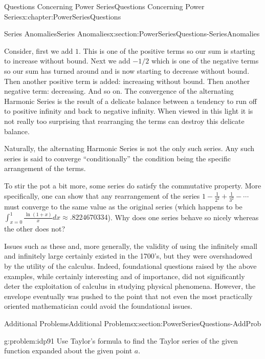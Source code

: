 \begin{chapterptx}{Questions Concerning Power Series}{}{Questions Concerning Power Series}{}{}{x:chapter:PowerSeriesQuestions}
\begin{sectionptx}{Series Anomalies}{}{Series Anomalies}{}{}{x:section:PowerSeriesQuestions-SeriesAnomalies}
		\par
		Consider, first we add \(1\). This is one of the positive terms so our sum is starting to increase without bound. Next we add \(-1/2\) which is one of the negative terms so our sum has turned around and is now starting to decrease without bound. Then another positive term is added: increasing without bound. Then another negative term: decreasing. And so on. The convergence of the alternating Harmonic Series is the result of a delicate balance between a tendency to run off to positive infinity and back to negative infinity. When viewed in this light it is not really too surprising that rearranging the terms can destroy this delicate balance.%
		\par
		Naturally, the alternating Harmonic Series is not the only such series. Any such series is said to converge ``conditionally'' \textemdash{} the condition being the specific arrangement of the terms.%
		\par
		To stir the pot a bit more, some series do satisfy the commutative property. More specifically, one can show that any rearrangement of the series \(1-\frac{1}{2^2}+\frac{1}{3^2}-\cdots\) must converge to the same value as the original series (which happens to be \(\int_{x=0}^1\frac{\text{ ln } (1+x)}{x}dx\approx.8224670334\)). Why does one series behave so nicely whereas the other does not?%
		\par
		Issues such as these and, more generally, the validity of using the infinitely small and infinitely large certainly existed in the 1700's, but they were overshadowed by the utility of the calculus. Indeed, foundational questions raised by the above examples, while certainly interesting and of importance, did not significantly deter the exploitation of calculus in studying physical phenomena. However, the envelope eventually was pushed to the point that not even the most practically oriented mathematician could avoid the foundational issues.%
	\end{sectionptx}
	\typeout{************************************************}
	\typeout{************************************************}
	\begin{sectionptx}{Additional Problems}{}{Additional Problems}{}{}{x:section:PowerSeriesQuestions-AddProb}
		\begin{problem}{}{g:problem:idp91}%
			Use Taylor's formula to find the Taylor series of the given function expanded about the given point \(a\).%
			\begin{enumerate}[font=\bfseries,label=(\alph*),ref=\alph*]

\end{enumerate}
\end{problem}
\end{sectionptx}
\end{chapterptx}
